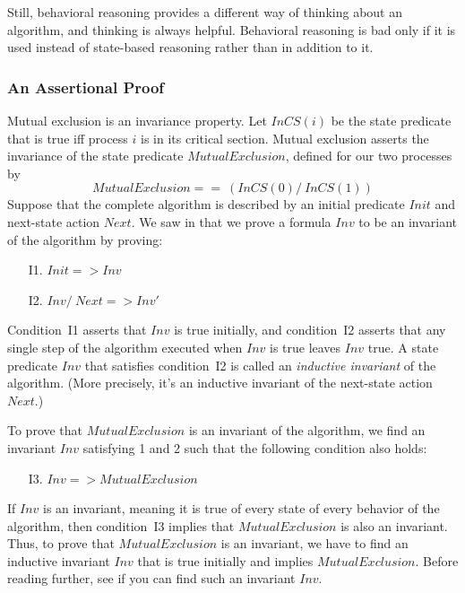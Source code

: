 \documentclass[fleqn,leqno]{article}
\begin{document}
Still, behavioral reasoning provides a different way of thinking about
an algorithm, and thinking is always helpful.  
Behavioral reasoning is bad only if it is used instead of state-based
reasoning rather than in addition to it.



\subsubsection{An Assertional Proof} 

Mutual exclusion is an invariance property.  Let $InCS(i)$ be the
state predicate that is true iff process $i$ is in its critical
section.  Mutual exclusion asserts the invariance of the state
predicate ${MutualExclusion}$, defined for our two processes by
 \[  {MutualExclusion} == ~(InCS(0) /\ InCS(1)) \]
Suppose that the complete algorithm is described by an initial
predicate $Init$ and next-state action $Next$.  We saw in
that we prove a formula $Inv$ to be an invariant of the algorithm by
proving:
\begin{enumerate}
\item[I1.] $Init => Inv$
\item[I2.] $Inv /\ Next => Inv'$
\end{enumerate}
Condition~I1 asserts that $Inv$ is true initially, and condition~I2
asserts that any single step 
of the algorithm executed when $Inv$ is
true leaves $Inv$ true.  A state predicate $Inv$ that satisfies
condition~I2 is called an 
\emph{inductive invariant} of the algorithm.  (More precisely, it's
an inductive invariant of the next-state action $Next$.)


To prove that ${MutualExclusion}$ is an invariant of the algorithm, we find an
invariant $Inv$ satisfying 1 and 2 such that the following condition
also holds:
\begin{enumerate}
\item[I3.] $Inv => {MutualExclusion}$
\end{enumerate}
If $Inv$ is an invariant, meaning it is true of every state of every
behavior of the algorithm, then condition~I3 implies that ${MutualExclusion}$ is
also an invariant.  Thus, to prove that ${MutualExclusion}$ is an invariant, we
have to find an inductive invariant $Inv$ that is true initially and
implies ${MutualExclusion}$.  Before reading further, see if you can find such an
invariant $Inv$.
\end{document}
